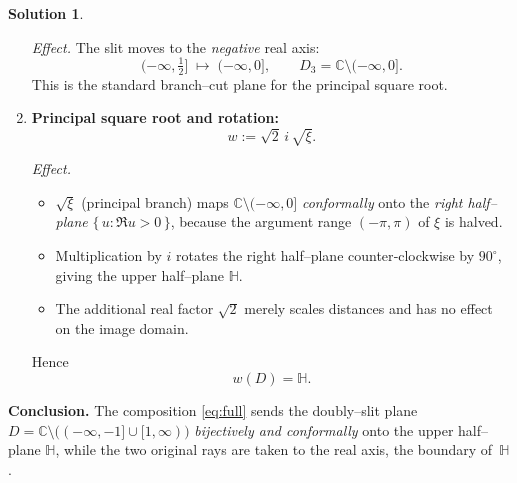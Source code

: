 \documentclass[12pt]{article}
\theoremstyle{definition} %
\newtheorem{solution}{Solution}
\theoremstyle{plain} %
\begin{document}
\begin{solution}
\begin{enumerate}[label=\textbf{Step~\arabic*.},wide,labelwidth=!,labelindent=0pt]
        \emph{Effect.}
        The slit moves to the \emph{negative} real axis:
        \[
           (-\infty,\tfrac12]\;\longmapsto\;(-\infty,0],
           \qquad
           D_3=\mathbb{C}\setminus(-\infty,0].
        \]
        This is the standard branch–cut plane for the principal square
        root.
  
  \item \textbf{Principal square root and rotation:}
        \[
           w:=\sqrt{2}\,i\,\sqrt{\xi}.
        \]
  
        \emph{Effect.}
        \begin{itemize}
          \item $\sqrt{\xi}$ (principal branch) maps 
                $\mathbb{C}\setminus(-\infty,0]$ \emph{conformally} onto the
                \emph{right half–plane} $\{\,u:\Re u>0\,\}$, because the
                argument range $(-\pi,\pi)$ of $\xi$ is halved.
          \item Multiplication by $i$ rotates the right half–plane
                counter‑clockwise by $90^{\circ}$, giving the upper
                half–plane $\mathbb{H}$.
          \item The additional real factor $\sqrt{2}$ merely scales
                distances and has no effect on the image domain.
        \end{itemize}
        Hence
        \[
           w(D)=\mathbb{H}.
        \]
  
  \end{enumerate}
  
  \bigskip
  \textbf{Conclusion.}
  The composition \eqref{eq:full} sends the doubly–slit plane
  $D=\mathbb{C}\setminus\bigl((-\infty,-1]\cup[1,\infty)\bigr)$ 
  \emph{bijectively and conformally} onto the upper half–plane
  $\mathbb{H}$, while the two original rays are taken to the real axis,
  the boundary of~$\mathbb{H}$.
  
  \end{solution}
\end{document}

